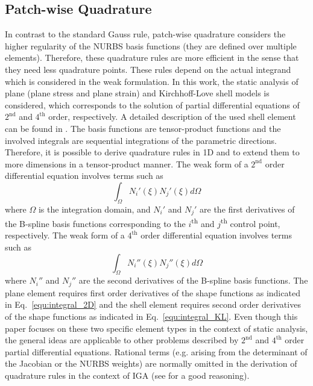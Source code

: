 \documentclass[3p]{elsarticle}
\begin{document}
\subsection{Patch-wise Quadrature} \label{sec:patch_wise_integration}
In contrast to the standard Gauss rule, patch-wise quadrature considers the higher regularity of the NURBS basis functions (they are defined over multiple elements). Therefore, these quadrature rules are more efficient in the sense that they need less quadrature points. These rules depend on the actual integrand which is considered in the weak formulation. In this work, the static analysis of plane (plane stress and plane strain) and Kirchhoff-Love shell models is considered, which corresponds to the solution of partial differential equations of $2^{\text{nd}}$ and $4^{\text{th}}$ order, respectively. A detailed description of the used shell element can be found in \cite{Kiendl2011}. The basis functions are tensor-product functions and the involved integrals are sequential integrations of the parametric directions. Therefore, it is possible to derive quadrature rules in 1D and to extend them to more dimensions in a tensor-product manner. The weak form of a $2^{\text{nd}}$ order differential equation involves terms such as
\begin{equation}\label{equ:integral_2D} 
	\int_{\Omega} N_i'(\xi) N_j'(\xi) d\Omega
\end{equation}
where $\Omega$ is the integration domain, and $N_i'$ and $N_j'$ are the first derivatives of the B-spline basis functions corresponding to the $i$\textsuperscript{th} and $j$\textsuperscript{th} control point, respectively. The weak form of a $4^{\text{th}}$ order differential equation involves terms such as
\begin{equation}\label{equ:integral_KL} 
	\int_{\Omega} N_i''(\xi) N_j''(\xi) d\Omega
\end{equation}
where $N_i''$ and $N_j''$ are the second derivatives of the B-spline basis functions. The plane element requires first order derivatives of the shape functions as indicated in Eq.~\eqref{equ:integral_2D} and the shell element requires second order derivatives of the shape functions as indicated in Eq.~\eqref{equ:integral_KL}. Even though this paper focuses on these two specific element types in the context of static analysis, the general ideas are applicable to other problems described by $2^{\text{nd}}$ and $4^{\text{th}}$ order partial differential equations. Rational terms (e.g. arising from the determinant of the Jacobian or the NURBS weights) are normally omitted in the derivation of quadrature rules in the context of IGA (see \cite{Hughes2010} for a good reasoning). \bigskip
\end{document}
